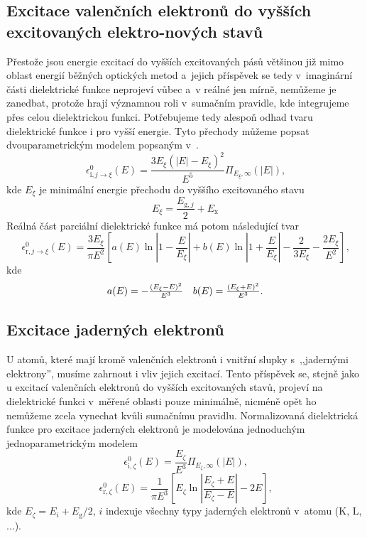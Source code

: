 \subsection{Excitace valenčních elektronů do vyšších excitovaných elektro-nových stavů}
Přestože jsou energie excitací do vyšších excitovaných pásů většinou již mimo oblast energií běžných optických metod a~jejich příspěvek se tedy v~imaginární části dielektrické funkce neprojeví vůbec a~v reálné jen mírně, nemůžeme je zanedbat, protože hrají významnou roli v~sumačním pravidle, kde integrujeme přes celou dielektrickou funkci. Potřebujeme tedy alespoň odhad tvaru dielektrické funkce i pro vyšší energie. 
Tyto přechody můžeme popsat dvouparametrickým modelem popsaným v~\cite{sumrule}.
\begin{equation}
\label{vyssiexcitace}
\epsilon_{\mathrm{i}, j \rightarrow \xi}^0(E) = \frac{3 E_\xi(|E| - E_\xi)^2}{E^5} \Pi_{E_\xi, \infty}(|E|) \text{,}
\end{equation}
kde $E_\xi$ je minimální energie přechodu do vyššího excitovaného stavu
\begin{equation}
E_\xi = \frac{E_{\mathrm{g},j}}{2} + E_\mathrm{x}
\end{equation}
Reálná část parciální dielektrické funkce má potom následující tvar
\begin{equation}
\epsilon_{\mathrm{r}, j \rightarrow \xi}^0(E) = 
\frac{3E_\xi}{\pi E^2}
\left[
	a(E) \ln\left|1-\frac{E}{E_\xi}\right|
	+ b(E) \ln\left|1 + \frac{E}{E_\xi}\right|
	- \frac{2}{3E_\xi} - \frac{2E_\xi}{E^2}
\right] \text{,}
\end{equation}
kde
\begin{equation}
\begin{array}{c c}
a(E) = -\frac{(E_\xi - E)^2}{E^3} &
b(E) = \frac{(E_\xi + E)^2}{E^3} \text{.}\\
\end{array}
\end{equation}


\subsection{Excitace jaderných elektronů}
U atomů, které mají kromě valenčních elektronů i vnitřní slupky s~,,jadernými elektrony'', musíme zahrnout i vliv jejich excitací. Tento příspěvek se, stejně jako u excitací valenčních elektronů do vyšších excitovaných stavů, projeví na dielektrické funkci v~měřené oblasti pouze minimálně, nicméně opět ho nemůžeme zcela vynechat kvůli sumačnímu pravidlu. Normalizovaná dielektrická funkce pro excitace jaderných elektronů je modelována jed\-no\-duchým jedno\-para\-metrickým modelem \cite{sumrule2}
\begin{equation}
\label{jaderneel}
\epsilon_{\mathrm{i},\zeta}^0(E) = \frac{E_\zeta}{E^3} \Pi_{E_\zeta,\infty}(|E|) \text{,}
\end{equation}
\begin{equation}
\epsilon_{\mathrm{r},\zeta}^0(E) = \frac{1}{\pi E^3}\left[ E_\zeta \ln\left| \frac{E_\zeta + E}{E_\zeta - E}\right| - 2E \right] \text{,}
\end{equation}
kde $E_\zeta = E_i + E_\mathrm{g}/2$, $i$ indexuje všechny typy jaderných elektronů v~atomu (K, L, ...). 

